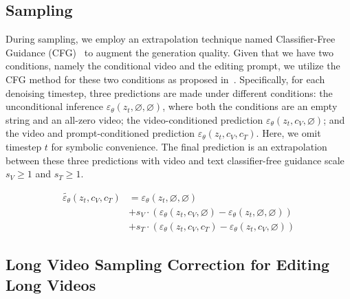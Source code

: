 


\subsection{Sampling}
During sampling, we employ an extrapolation technique named Classifier-Free Guidance (CFG)~\cite{cfg} to augment the generation quality. Given that we have two conditions, namely the conditional video and the editing prompt, we utilize the CFG method for these two conditions as proposed in~\cite{brooks2023instructpix2pix}. Specifically, for each denoising timestep, three predictions are made under different conditions: the unconditional inference $\varepsilon_\theta(z_t,\varnothing,\varnothing)$, where both the conditions are an empty string and an all-zero video; the video-conditioned prediction $\varepsilon_\theta(z_t,c_V,\varnothing)$; and the video and prompt-conditioned prediction $\varepsilon_\theta(z_t,c_V,c_T)$. Here, we omit timestep $t$ for symbolic convenience. The final prediction is an extrapolation between these three predictions with video and text classifier-free guidance scale $s_V \geq 1$ and $s_T \geq 1$. 

\begin{align}
    \tilde{\varepsilon_\theta}(z_t, c_V, c_T) &= \varepsilon_\theta(z_t, \varnothing, \varnothing) \\ \nonumber
    &+ s_V \cdot (\varepsilon_\theta(z_t, c_V, \varnothing) - \varepsilon_\theta(z_t, \varnothing, \varnothing)) \\ \nonumber
    &+ s_T \cdot (\varepsilon_\theta(z_t, c_V, c_T) - \varepsilon_\theta(z_t, c_V, \varnothing))
\end{align}


\subsection{Long Video Sampling Correction for Editing Long Videos}\label{sec.long_vid_editing}

